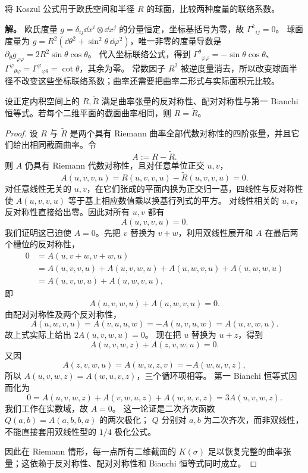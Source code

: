 \begin{exbox}
将 Koszul 公式用于欧氏空间和半径 $R$ 的球面，比较两种度量的联络系数。

\textbf{解。} 欧氏度量 $g=\delta_{ij}\dd x^i\otimes\dd x^j$ 的分量恒定，坐标基括号为零，故 $\Gamma^k{}_{ij}=0$。
球面度量为 $g=R^2(\dd\theta^2+\sin^2\theta\,\dd\varphi^2)$，唯一非零的度量导数是 $\partial_\theta g_{\varphi\varphi}=2R^2\sin\theta\cos\theta$。
代入坐标联络公式，得到 $\Gamma^\theta{}_{\varphi\varphi}=-\sin\theta\cos\theta$、$\Gamma^\varphi{}_{\theta\varphi}=\Gamma^\varphi{}_{\varphi\theta}=\cot\theta$，其余为零。
常数因子 $R^2$ 被逆度量消去，所以改变球面半径不改变这些坐标联络系数；曲率还需要把曲率二形式与实际面积元比较。
\end{exbox}

\begin{lemma}[截面曲率决定代数曲率张量]
设正定内积空间上的 $R,\widetilde R$ 满足曲率张量的反对称性、配对对称性与第一 Bianchi 恒等式。若每个二维平面的截面曲率相同，则 $R=\widetilde R$。
\end{lemma}

\begin{proof}
设 $R$ 与 $\widetilde R$ 是两个具有 Riemann 曲率全部代数对称性的四阶张量，并且它们给出相同截面曲率。令
\begin{equation*}
A:=R-\widetilde R.
\end{equation*}
则 $A$ 仍具有 Riemann 代数对称性，且对任意单位正交 $u,v$，
\begin{equation*}
A(u,v,v,u)=R(u,v,v,u)-\widetilde R(u,v,v,u)=0.
\end{equation*}
对任意线性无关的 $u,v$，在它们张成的平面内换为正交归一基，四线性与反对称性使 $A(u,v,v,u)$ 等于基上相应数值乘以换基行列式的平方。
对线性相关的 $u,v$，反对称性直接给出零。因此对所有 $u,v$ 都有
\begin{equation*}
A(u,v,v,u)=0.
\end{equation*}
我们证明这已迫使 $A=0$。先把 $v$ 替换为 $v+w$，利用双线性展开和 $A$ 在最后两个槽位的反对称性，
\begin{align*}
0&=A(u,v+w,v+w,u)\\
&=A(u,v,v,u)+A(u,v,w,u)+A(u,w,v,u)+A(u,w,w,u)\\
&=A(u,v,w,u)+A(u,w,v,u),
\end{align*}
即
\begin{equation*}
A(u,v,w,u)+A(u,w,v,u)=0.
\end{equation*}
由配对对称性及两个反对称性，
\[
A(u,w,v,u)=A(v,u,u,w)=-A(u,v,u,w)=A(u,v,w,u).
\]
故上式实际上给出 $2A(u,v,w,u)=0$。
现在把 $u$ 替换为 $u+z$，得到
\[
A(u,v,w,z)+A(z,v,w,u)=0.
\]
又因
\[
A(z,v,w,u)=A(w,u,z,v)=-A(w,u,v,z),
\]
所以 $A(u,v,w,z)=A(w,u,v,z)$，三个循环项相等。
第一 Bianchi 恒等式因而化为
\[
0=A(u,v,w,z)+A(v,w,u,z)+A(w,u,v,z)=3A(u,v,w,z).
\]
我们工作在实数域，故 $A=0$。
这一论证是二次齐次函数 $Q(a,b)=A(a,b,b,a)$ 的两次极化；
$Q$ 分别对 $a,b$ 为二次齐次，而非双线性，不能直接套用双线性型的 $1/4$ 极化公式。

因此在 Riemann 情形，每一点所有二维截面的 $K(\sigma)$ 足以恢复完整的曲率张量；这依赖于反对称性、配对对称性和 Bianchi 恒等式同时成立。
\end{proof}

